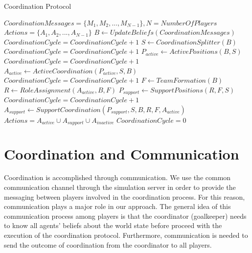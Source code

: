 \begin{algorithm}[ht!]
\caption{Coordination Protocol }
\label{CoordinationAlgorithm}
\begin{algorithmic}[1]
\begin{small}
$Coordination Messages = \lbrace M_{1},M_{2},...,M_{N-1} \rbrace, N = Number Of Players $
$Actions = \lbrace A_{1},A_{2},...,A_{N-1} \rbrace$
\STATE
{}
\STATE $B \leftarrow Update Beliefs(Coordination Messages) $
\STATE $CoordinationCycle = CoordinationCycle + 1$
\STATE $S \leftarrow Coordination Splitter(B) $
\STATE $CoordinationCycle = CoordinationCycle + 1$
\STATE $P_{active} \leftarrow Active Positions(B,S) $
\STATE $CoordinationCycle = CoordinationCycle + 1$
\STATE $A_{active} \leftarrow Active Coordination(P_{active},S,B) $
\STATE $CoordinationCycle = CoordinationCycle + 1$
\STATE $ F \leftarrow TeamFormation(B) $
\STATE $ R \leftarrow Role Assignment(A_{active},B,F) $
\STATE $ P_{support} \leftarrow Support Positions(R,F,S) $
\STATE $CoordinationCycle = CoordinationCycle + 1$
\STATE $A_{support} \leftarrow Support Coordination(P_{support},S,B,R,F,A_{active}) $
\STATE $Actions = A_{active} \cup A_{support} \cup A_{inactive}$
\STATE $CoordinationCycle = 0$
\ENDIF
\end{small}
\end{algorithmic}
\end{algorithm}


\section{Coordination and Communication}
Coordination is accomplished through communication. We use the common communication channel through the simulation server in order to provide the messaging between players involved in the coordination process. For this reason, communication plays a major role in our approach. The general idea of this communication process among players is that the coordinator (goalkeeper) needs to know all agents' beliefs about the world state before proceed with the execution of the coordination protocol. Furthermore, communication is needed to send the outcome of coordination from the coordinator to all players. 


